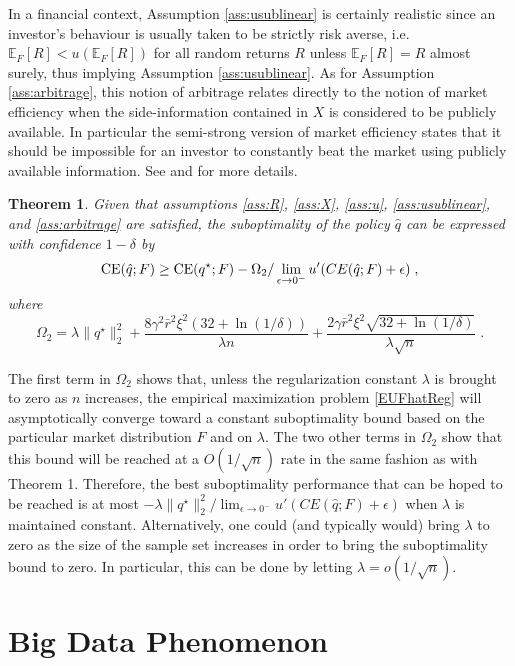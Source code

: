 \documentclass[]{interact}
\theoremstyle{plain}%
\theoremstyle{definition}
\theoremstyle{remark}
\def\Expect{{\mathbb E}}
\newcommand{\0}{\V{0}}
\newcommand{\1}{\V{1}}
\newcommand{\modified}[1]{{\color{blue} #1}}
\def\CE{\mathop{\rm CE}}
\theoremstyle{plain}
\newtheorem{thm}{Theorem}
\theoremstyle{definition}
\begin{document}
In a financial context, Assumption \ref{ass:usublinear} is certainly realistic since an
investor's behaviour is usually taken to be strictly risk averse, i.e. $\Expect_F[R]<u(\Expect_F[R])$ for all random returns $R$ unless $\Expect_F[R]=R$ almost surely, thus implying Assumption \ref{ass:usublinear}.  As for Assumption \ref{ass:arbitrage}, this notion of arbitrage relates
directly to the notion of market efficiency when the side-information contained in $X$ is considered to be publicly available. In particular the semi-strong version
of market efficiency states that it should be impossible for an investor to constantly beat the
market using publicly available information. See \cite{malkiel1970efficient} and
\cite{fama1991efficient} for more details.

\begin{thm}
  \label{thm_truopt}
  Given that assumptions \ref{ass:R}, \ref{ass:X}, \ref{ass:u}, \ref{ass:usublinear}, and \ref{ass:arbitrage} are satisfied, the
  suboptimality of the policy $\hat q$ can be expressed with confidence $1-\delta$ by
  \[
    \CE(\hat q;F) \geq \CE(q^\star;F) - \Omega_2/\lim_{\epsilon\to0^{-}}u'(CE(\hat q;F)+\epsilon)\;,
  \]
  where
  \[
    \Omega_2 = \lambda\|q^\star\|_2^2 +\frac{8\gamma^2\bar{r}^2\xi^2(32+\ln(1/\delta))}{\lambda n} +\frac{2\gamma\bar{r}^2\xi^2\sqrt{32+\ln(1/\delta)}}{\lambda\sqrt{ n}}\;.
  \]
\end{thm}

The first term in $\Omega_2$ shows that, unless the regularization constant $\lambda$ is
brought to zero as $n$ increases, the empirical maximization problem \eqref{EUFhatReg}
will asymptotically converge toward a constant suboptimality bound based on the particular
market distribution $F$ and on $\lambda$. The two other terms in $\Omega_2$ show that this
bound will be reached at a $O(1/\sqrt{n})$ rate in the same fashion as with Theorem
1. Therefore, the best suboptimality performance that can be hoped to be reached is at
most $-\lambda\|q^\star\|_2^2 /\lim_{\epsilon\to0^{-}}u'(CE(\hat q;F)+\epsilon)$ when $\lambda$ is maintained constant. \modified{Alternatively, one could (and typically would) bring $\lambda$ to zero as the size of the sample set increases in order to bring the suboptimality bound to zero. In particular, this can be done by letting $\lambda=o(1/\sqrt{n})$.}


%
\section{Big Data Phenomenon}\label{sec:bigdata}
\end{document}
